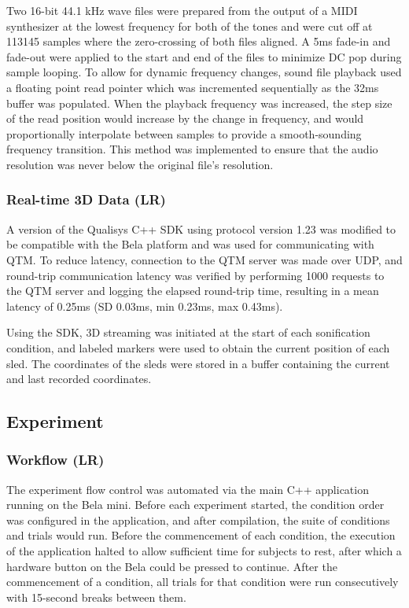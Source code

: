 \documentclass[10pt,a4paper,onecolumn]{article}
\begin{document}
Two 16-bit 44.1 kHz wave files were prepared from the output of a MIDI synthesizer at the lowest frequency for both of the tones and were cut off at 113145 samples where the zero-crossing of both files aligned. A 5ms fade-in and fade-out were applied to the start and end of the files to minimize DC pop during sample looping. To allow for dynamic frequency changes, sound file playback used a floating point read pointer which was incremented sequentially as the 32ms buffer was populated. When the playback frequency was increased, the step size of the read position would increase by the change in frequency, and would proportionally interpolate between samples to provide a smooth-sounding frequency transition. This method was implemented to ensure that the audio resolution was never below the original file's resolution.

\hypertarget{real-time-3d-data-lr}{%
\subsubsection{Real-time 3D Data (LR)}\label{real-time-3d-data-lr}}

A version of the Qualisys C++ SDK using protocol version 1.23 was modified to be compatible with the Bela platform and was used for communicating with QTM. To reduce latency, connection to the QTM server was made over UDP, and round-trip communication latency was verified by performing 1000 requests to the QTM server and logging the elapsed round-trip time, resulting in a mean latency of 0.25ms (SD 0.03ms, min 0.23ms, max 0.43ms).

Using the SDK, 3D streaming was initiated at the start of each sonification condition, and labeled markers were used to obtain the current position of each sled. The coordinates of the sleds were stored in a buffer containing the current and last recorded coordinates.

\hypertarget{experiment}{%
\subsection{Experiment}\label{experiment}}

\hypertarget{workflow-lr}{%
\subsubsection{Workflow (LR)}\label{workflow-lr}}

The experiment flow control was automated via the main C++ application running on the Bela mini. Before each experiment started, the condition order was configured in the application, and after compilation, the suite of conditions and trials would run. Before the commencement of each condition, the execution of the application halted to allow sufficient time for subjects to rest, after which a hardware button on the Bela could be pressed to continue. After the commencement of a condition, all trials for that condition were run consecutively with 15-second breaks between them.
\end{document}
